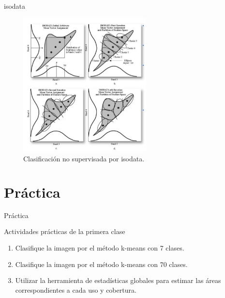 \documentclass[]{beamer}
\begin{document}
\begin{frame}{isodata}
  \begin{figure}
    \includegraphics[width=0.6\textwidth]{imagenes/isodata.png}
    \caption{Clasificación no supervisada por isodata.}
  \end{figure}
\end{frame}

\section{Práctica}

\begin{frame}{Práctica}
  \begin{exampleblock}{Actividades prácticas de la primera clase}
    \begin{enumerate}
      \item Clasifique la imagen por el método k-means con 7 clases.
      \item Clasifique la imagen por el método k-means con 70 clases.
      \item Utilizar la herramienta de estadísticas globales para estimar las áreas correspondientes a cada uso y cobertura.
    \end{enumerate}
  \end{exampleblock}
\end{frame}
\end{document}

